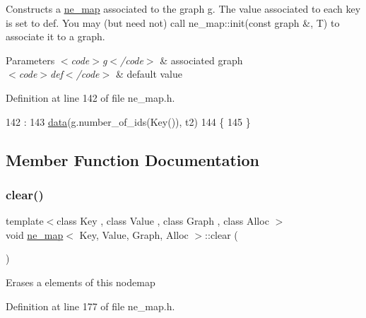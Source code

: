 Constructs a {\ttfamily \mbox{\hyperlink{classne__map}{ne\+\_\+map}}} associated to the {\ttfamily graph g}. The value associated to each key is set to {\ttfamily def}. You may (but need not) call {\ttfamily ne\+\_\+map\+::init(const graph \&, T)} to associate it to a {\ttfamily graph}.


\begin{DoxyParams}{Parameters}
{\em $<$code$>$g$<$/code$>$} & associated {\ttfamily graph} \\
\hline
{\em $<$code$>$def$<$/code$>$} & default value \\
\hline
\end{DoxyParams}


Definition at line 142 of file ne\+\_\+map.\+h.


\begin{DoxyCode}
142                                                               :
143     \mbox{\hyperlink{classne__map_af73307678e05a9c24c084d98b267afa8}{data}}(\mbox{\hyperlink{rings_8cpp_aa9df5aa3976a89a96a5f1c7611d42938}{g}}.number\_of\_ids(Key()), t2)
144 \{
145 \}
\end{DoxyCode}


\subsection{Member Function Documentation}
\mbox{\label{classne__map_aebe555c23769c6dcc869b5ac7fae6a9c}} 
\subsubsection{\texorpdfstring{clear()}{clear()}}
{\footnotesize\ttfamily template$<$class Key , class Value , class Graph , class Alloc $>$ \\
void \mbox{\hyperlink{classne__map}{ne\+\_\+map}}$<$ Key, Value, Graph, Alloc $>$\+::clear (\begin{DoxyParamCaption}{ }\end{DoxyParamCaption})}

Erases a elements of this nodemap 

Definition at line 177 of file ne\+\_\+map.\+h.


